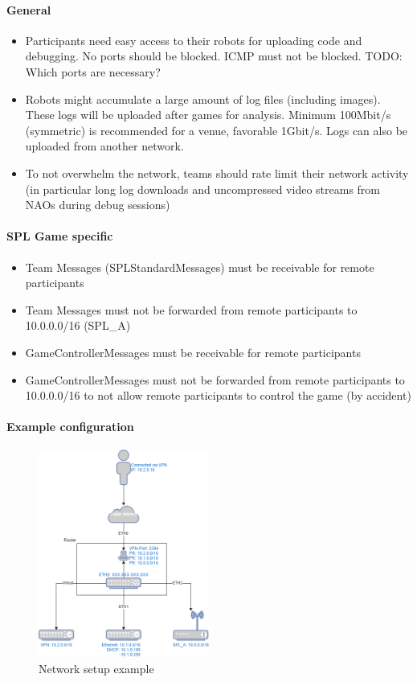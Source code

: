\paragraph{General}

\begin{itemize}
    \item Participants need easy access to their robots for uploading code and debugging. No ports should be blocked. ICMP must not be blocked. TODO: Which ports are necessary?
    \item Robots might accumulate a large amount of log files (including images). These logs will be uploaded after games for analysis. Minimum 100Mbit/s (symmetric) is recommended for a venue, favorable 1Gbit/s. Logs can also be uploaded from another network.
    \item To not overwhelm the network, teams should rate limit their network activity (in particular long log downloads and uncompressed video streams from NAOs during debug sessions)
\end{itemize}

\paragraph{SPL Game specific}

\begin{itemize}
    \item Team Messages (SPLStandardMessages) must be receivable for remote participants
    \item Team Messages must not be forwarded from remote participants to 10.0.0.0/16 (SPL\_A)
    \item GameControllerMessages must be receivable for remote participants
    \item GameControllerMessages must not be forwarded from remote participants to 10.0.0.0/16 to not allow remote participants to control the game (by accident)
\end{itemize}

\paragraph{Example configuration}

\begin{figure}[ht!]
    \centering
    \includegraphics[width=0.5\textwidth]{figs/network.png}
    \caption{Network setup example}
\end{figure}

